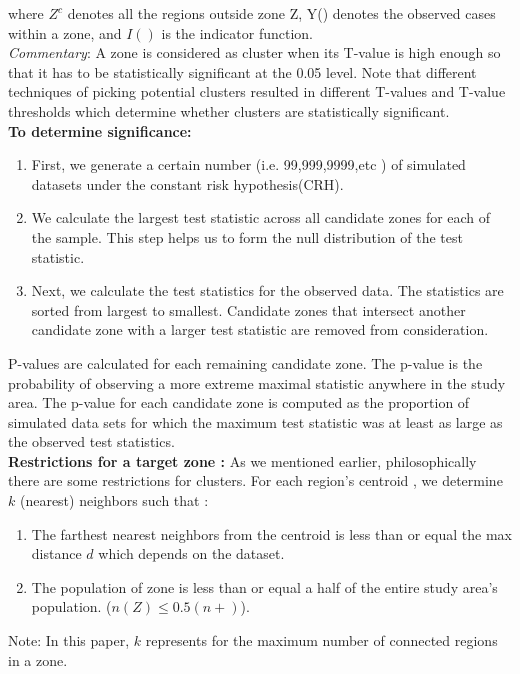 \documentclass[12pt]{article}
\begin{document}
				where $ Z^c$ denotes all the regions outside zone Z, Y() denotes the observed cases within a zone, and $I()$ is the indicator function. \\ 
			
			 \textit{Commentary}: A zone is considered as cluster when its T-value is high enough so that it has to be statistically significant at the 0.05 level. Note that different techniques of picking potential clusters resulted in different T-values and T-value thresholds which determine whether clusters are statistically significant. \\
			 
			 \textbf{To determine significance:} \\
			 \begin{enumerate}
			 	
			 \item First, we generate a certain number (i.e. 99,999,9999,etc ) of simulated datasets under the constant risk hypothesis(CRH).
			 
			 \item We calculate the largest test statistic across all candidate zones for each of the sample. This step helps us to form the null distribution of the test statistic.
			 
			 \item Next, we calculate the test statistics for the observed data. The statistics are sorted from largest to smallest.  Candidate zones that intersect another candidate zone with a larger test statistic are removed from consideration.\\
			 
			 \end{enumerate}
			
			P-values are calculated for each remaining candidate zone.  The p-value is the probability of observing a more extreme maximal statistic anywhere in the study area.  The p-value for each candidate zone is computed as the proportion of simulated data sets for which the maximum test statistic was at least as large as the observed test statistics.\\
			
			\textbf{Restrictions for a target zone : } As we mentioned earlier, philosophically there are some restrictions for clusters. For each region's centroid , we determine $k$ (nearest) neighbors such that : \\
				\begin{enumerate}
					\item The farthest nearest neighbors from the centroid is less than or equal the max distance $d$ which depends on the dataset. \\ 
					\item The population of zone is less than or equal a half of the entire study area's population. ($n(Z) \leq 0.5(n+)$).\\
				\end{enumerate}
				Note: In this paper, $k$ represents for the maximum number of connected regions in a zone.\\
\end{document}
